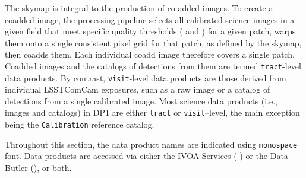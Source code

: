 The skymap is integral to the production of co-added images.
To create a coadded image, the processing pipeline selects all calibrated science images in a given field that meet specific quality thresholds ( and ) for a given \gls{patch}, warps them onto a single consistent pixel grid for that \gls{patch}, as defined by the skymap, then coadds them.
Each individual coadd image therefore covers a single \gls{patch}.
Coadded images and the catalogs of detections from them are termed \texttt{tract}-level data products.
By contrast, \texttt{visit}-level data products are those derived from individual \gls{LSSTComCam} exposures, such as a raw image or a catalog of detections from a single calibrated image.
Most science data products (i.e., images and catalogs) in \gls{DP1} are either \texttt{tract} or \texttt{visit}--level, the main exception being the \texttt{Calibration} reference catalog.

Throughout this section, the data product names are indicated using \texttt{monospace} font.
Data products are accessed via either the \gls{IVOA} Services ( ) or the Data \gls{Butler} (), or both.





